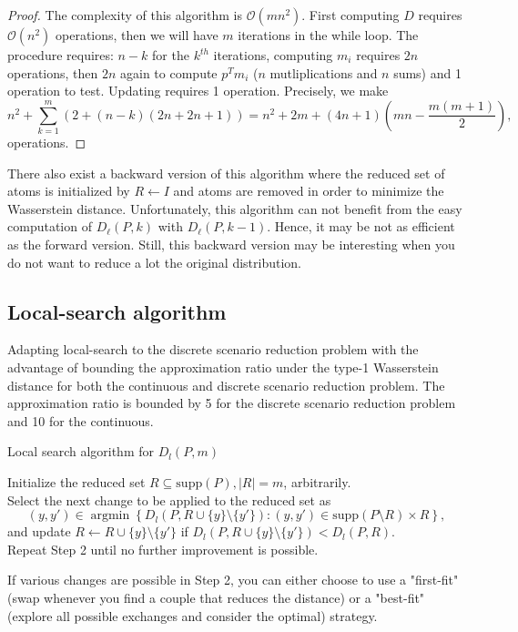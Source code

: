 \documentclass{amsart}
\newcommand{\argmin}{\mathop{\arg\min}}
\begin{document}
\begin{proof}\label{complexity}
The complexity of this algorithm is $\mathcal{O}\left(mn^2\right)$. First computing $D$ requires $\mathcal{O}\left(n^2\right)$ operations, then we will have $m$ iterations in the while loop. The procedure requires: $n-k$ for the $k^{th}$ iterations, computing $m_i$ requires $2n$ operations, then $2n$ again to compute $p^Tm_i$ ($n$ mutliplications and $n$ sums) and 1 operation to test. Updating requires 1 operation.
Precisely, we make
$$
n^2+\sum_{k=1}^m\left(2+\left(n-k\right)\left(2n+2n+1\right)\right)= n^2+2m+\left(4n+1\right)\left(mn-\frac{m\left(m+1\right)}{2}\right),
$$
operations.
\end{proof}
There also exist a backward version of this algorithm where the reduced set of atoms is initialized by $R\gets I$ and atoms are removed in order to minimize the Wasserstein distance. Unfortunately, this algorithm can not benefit from the easy computation of $D_\ell\left(P,k\right)$ with $D_\ell\left(P,k-1\right)$. Hence, it may be not as efficient as the forward version. Still, this backward version may be interesting when you do not want to reduce a lot the original distribution.
\subsection{Local-search algorithm}\label{guarant}
Adapting local-search to the discrete scenario reduction problem with the advantage of bounding the approximation ratio under the type-1 Wasserstein distance for both the continuous and discrete scenario reduction problem. The approximation ratio is bounded by 5 for the discrete scenario reduction problem and 10 for the continuous.
\begin{algorithm}
    \caption{Local search algorithm for $D_l\left(P,m\right)$}\label{Local search}
    Initialize the reduced set $R\subseteq \text{supp}\left(P\right), \lvert R\rvert = m$, arbitrarily. \\ Select the next change to be applied to the reduced set as 
    $$
    \left(y,y'\right)\in\argmin\left\{D_l\left(P,R\cup\{y\}\setminus \{y'\}\right) : \left(y,y'\right)\in\text{supp}\left(P\setminus R\right)\times R\right\},
    $$
    and update $R\gets R\cup \{y\}\setminus \{y'\}$ if $D_l\left(P, R\cup\{y\}\setminus \{y'\} \right)<D_l\left(P,R\right).$ \\ Repeat Step 2 until no further improvement is possible.
\end{algorithm}

If various changes are possible in Step 2, you can either choose to use a "first-fit" (swap whenever you find a couple that reduces the distance) or a "best-fit" (explore all possible exchanges and consider the optimal) strategy.
\end{document}
